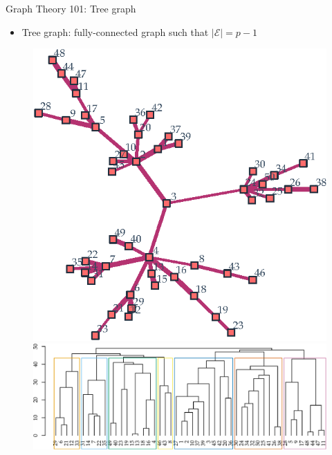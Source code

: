\documentclass[aspectratio=169]{beamer}
\begin{document}
\begin{frame}{Graph Theory 101: Tree graph}
  \vspace{.5cm}
  \begin{itemize}
    \item Tree graph: fully-connected graph such that $|\mathcal{E}| = p-1$
    \pause
  \end{itemize}
  \begin{figure}
    \centering
    \includegraphics[scale=0.45]{images/tree-original.eps}
    \includegraphics[scale=0.45]{images/dendogram-original.eps}
  \end{figure}
\end{frame}
\end{document}
